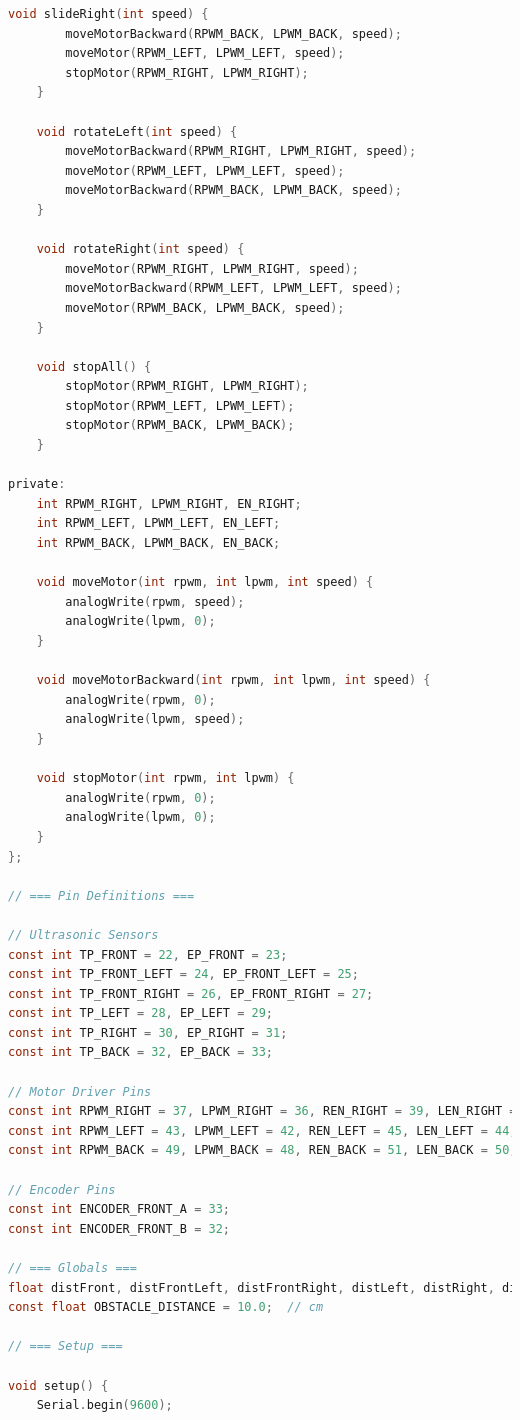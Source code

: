 \documentclass{article}
\begin{document}
\begin{lstlisting}[language=C, basicstyle=\ttfamily\footnotesize, frame=single, xleftmargin=10mm, xrightmargin=10mm]
    void slideRight(int speed) {
        moveMotorBackward(RPWM_BACK, LPWM_BACK, speed);
        moveMotor(RPWM_LEFT, LPWM_LEFT, speed);
        stopMotor(RPWM_RIGHT, LPWM_RIGHT);
    }

    void rotateLeft(int speed) {
        moveMotorBackward(RPWM_RIGHT, LPWM_RIGHT, speed);
        moveMotor(RPWM_LEFT, LPWM_LEFT, speed);
        moveMotorBackward(RPWM_BACK, LPWM_BACK, speed);
    }

    void rotateRight(int speed) {
        moveMotor(RPWM_RIGHT, LPWM_RIGHT, speed);
        moveMotorBackward(RPWM_LEFT, LPWM_LEFT, speed);
        moveMotor(RPWM_BACK, LPWM_BACK, speed);
    }

    void stopAll() {
        stopMotor(RPWM_RIGHT, LPWM_RIGHT);
        stopMotor(RPWM_LEFT, LPWM_LEFT);
        stopMotor(RPWM_BACK, LPWM_BACK);
    }

private:
    int RPWM_RIGHT, LPWM_RIGHT, EN_RIGHT;
    int RPWM_LEFT, LPWM_LEFT, EN_LEFT;
    int RPWM_BACK, LPWM_BACK, EN_BACK;

    void moveMotor(int rpwm, int lpwm, int speed) {
        analogWrite(rpwm, speed);
        analogWrite(lpwm, 0);
    }

    void moveMotorBackward(int rpwm, int lpwm, int speed) {
        analogWrite(rpwm, 0);
        analogWrite(lpwm, speed);
    }

    void stopMotor(int rpwm, int lpwm) {
        analogWrite(rpwm, 0);
        analogWrite(lpwm, 0);
    }
};

// === Pin Definitions ===

// Ultrasonic Sensors
const int TP_FRONT = 22, EP_FRONT = 23;
const int TP_FRONT_LEFT = 24, EP_FRONT_LEFT = 25;
const int TP_FRONT_RIGHT = 26, EP_FRONT_RIGHT = 27;
const int TP_LEFT = 28, EP_LEFT = 29;
const int TP_RIGHT = 30, EP_RIGHT = 31;
const int TP_BACK = 32, EP_BACK = 33;

// Motor Driver Pins
const int RPWM_RIGHT = 37, LPWM_RIGHT = 36, REN_RIGHT = 39, LEN_RIGHT = 38;
const int RPWM_LEFT = 43, LPWM_LEFT = 42, REN_LEFT = 45, LEN_LEFT = 44;
const int RPWM_BACK = 49, LPWM_BACK = 48, REN_BACK = 51, LEN_BACK = 50;

// Encoder Pins
const int ENCODER_FRONT_A = 33;
const int ENCODER_FRONT_B = 32;

// === Globals ===
float distFront, distFrontLeft, distFrontRight, distLeft, distRight, distBack;
const float OBSTACLE_DISTANCE = 10.0;  // cm

// === Setup ===

void setup() {
    Serial.begin(9600);


\end{lstlisting}
\end{document}
